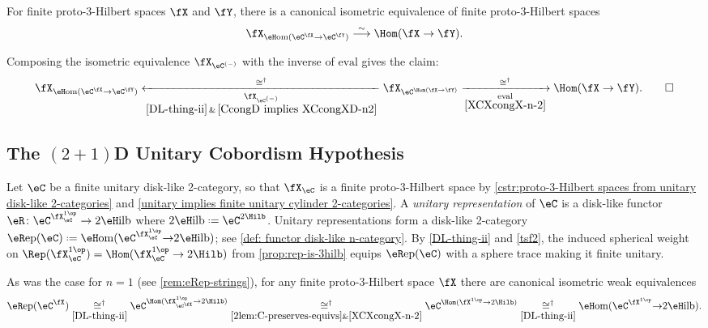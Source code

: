 \documentclass[12pt,reqno]{amsart}
\newcommand{\eRep}{{\eR}\mathrm{ep}}
\newcommand{\eFun}{{\eH}\mathrm{om}}
\newcommand{\eHilb}{{\eH}\mathrm{ilb}}
\newcommand{\eval}{\mathrm{eval}}
\newcommand{\C}{\eC}
\newcommand{\defn}[1]{\emph{#1}}
\DeclareRobustCommand{\coloneq}{\mathrel{\vcenter{\baselineskip0.5ex\lineskiplimit0pt\hbox{\scriptsize{\upshape.}}\hbox{\scriptsize{\upshape.}}}}=}
\begin{document}
\begin{corollary}
\label{dag-thing-ii-equiv}
\label{XFun-2}
For finite proto-3-Hilbert spaces $\fX$ and $\fY$, there is a canonical isometric equivalence of finite proto-3-Hilbert spaces
\[
    \fX_{\eFun(\C^\fX\to\C^\fY)} \overset\sim\longrightarrow \Hom(\fX\to\fY).
\]
\end{corollary}

\begin{pf}
    Composing the isometric equivalence $\fX_{\C^{(-)}}$ with the inverse of $\eval$ gives the claim:
    \[
    \fX_{\eFun(\C^\fX\to\C^\fY)}
    \xleftarrow[\substack{\fX_{\C^{(-)}}\\\eqref{DL-thing-ii}\,\&\,\eqref{CcongD implies XCcongXD-n2}}]{\cong^\dag}\fX_{\C^{\Hom(\fX\to\fY)}}
    \xrightarrow[\substack{\eval\\\eqref{XCXcongX-n-2}}]{\cong^\dag}
    \Hom(\fX\to\fY).\qedhere
    \]
\end{pf}

\subsection{The \texorpdfstring{$(2+1)$D}{(2+1)D} Unitary Cobordism Hypothesis}

Let $\C$ be a finite unitary disk-like 2-category, so that $\fX_\C$ is a finite proto-3-Hilbert space by \cref{cstr:proto-3-Hilbert spaces from unitary disk-like 2-categories} and \cref{unitary implies finite unitary cylinder 2-categories}. A \defn{unitary representation} of $\C$ is a disk-like functor $\eR\colon \C^{\fX_\C^{1\op}}\to 2\eHilb$ where $2\eHilb\coloneq\C^{2\Hilb}$. Unitary representations form a disk-like 2-category $\eRep(\C)\coloneq\eFun(\C^{\fX_\C^{1\op}}{\to}2\eHilb)$; see \cref{def: functor disk-like n-category}. By \cref{DL-thing-ii} and \cref{tsf2}, the induced spherical weight on $\Rep(\fX_\C^{1\op})=\Hom(\fX_\C^{1\op}\to2\Hilb)$
from \cref{prop:rep-is-3hilb}
equips $\eRep(\C)$ with a sphere trace making it finite unitary. 

\begin{remark}
\label{rem:eRep-strings-2}
As was the case for $n=1$ (see \cref{rem:eRep-strings}), for any finite proto-3-Hilbert space $\fX$ there are canonical isometric weak equivalences
\[
\eRep(\C^\fX)
\underset{\eqref{DL-thing-ii}}{\cong^\dag}
\C^{\Hom(\fX_{\C^\fX}^{1\op}\to2\Hilb)}
\underset{\eqref{2lem:C-preserves-equivs}\&\eqref{XCXcongX-n-2}}{\cong^\dag}
\C^{\Hom(\fX^{1\op}\to2\Hilb)}
\underset{\eqref{DL-thing-ii}}{\cong^\dag}
\eFun(\C^{\fX^{1\op}}{\to}2\eHilb).
\]
\end{remark}
\end{document}
